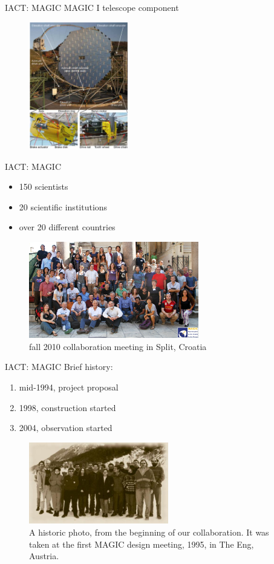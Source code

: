\documentclass{beamer}
\begin{document}
\begin{frame}{IACT: MAGIC}
    MAGIC I telescope component
    \begin{figure}[h]
        \includegraphics[width=165px]{MAGIC_I_component.png}
    \end{figure}
\end{frame}


\begin{frame}{IACT: MAGIC}
	\begin{itemize}
		\item 150 scientists
		\item 20 scientific institutions
		\item over 20 different countries
    \end{itemize}
    \begin{figure}[h]
        \includegraphics[width=280px]{CollaborationPicture2010.jpg}
        \caption{fall 2010 collaboration meeting in Split, Croatia}
    \end{figure}
\end{frame}


\begin{frame}{IACT: MAGIC}
	Brief history:
	\begin{enumerate}
        \item mid-1994, project proposal
        \item 1998, construction started
        \item 2004, observation started
    \end{enumerate}
    \begin{figure}[h]
        \includegraphics[width=230px]{magic-coll-old1.jpeg}
        \caption{A historic photo, from the beginning of our collaboration. It was taken at the first MAGIC design meeting, 1995, in The Eng, Austria.}
    \end{figure}
\end{frame}
\end{document}
